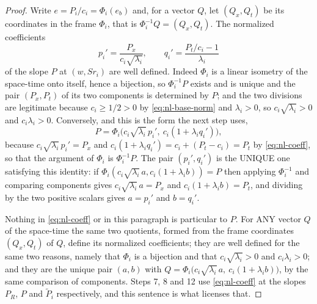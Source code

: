\begin{proof}
Write $e=P_i/c_i=\Phi_i(e_b)$ and, for a vector $Q$, let $(Q_x,Q_t)$ be its
coordinates in the frame $\Phi_i$, that is $\Phi_i^{-1}Q=(Q_x,Q_t)$. The normalized
coefficients
\begin{equation}\label{eq:nl-coeff}
  p_i'=\frac{P_x}{c_i\sqrt{\lambda_i}},\qquad
  q_i'=\frac{P_t/c_i-1}{\lambda_i}
\end{equation}
of the slope $P$ at $(w,Sr_i)$ are well defined. Indeed $\Phi_i$ is a linear isometry
of the space-time onto itself, hence a bijection, so $\Phi_i^{-1}P$ exists and is
unique and the pair $(P_x,P_t)$ of its two components is determined by $P$; and the
two divisions are legitimate because $c_i\ge1/2>0$ by \eqref{eq:nl-base-norm} and
$\lambda_i>0$, so $c_i\sqrt{\lambda_i}>0$ and $c_i\lambda_i>0$. Conversely, and this
is the form the next step uses,
\[
  P=\Phi_i\bigl(c_i\sqrt{\lambda_i}\,p_i',\ c_i(1+\lambda_iq_i')\bigr),
\]
because $c_i\sqrt{\lambda_i}\,p_i'=P_x$ and $c_i(1+\lambda_iq_i')=c_i+(P_t-c_i)=P_t$
by \eqref{eq:nl-coeff}, so that the argument of $\Phi_i$ is $\Phi_i^{-1}P$. The pair
$(p_i',q_i')$ is the UNIQUE one satisfying this identity: if
$\Phi_i(c_i\sqrt{\lambda_i}\,a,c_i(1+\lambda_ib))=P$ then applying $\Phi_i^{-1}$ and
comparing components gives $c_i\sqrt{\lambda_i}\,a=P_x$ and
$c_i(1+\lambda_ib)=P_t$, and dividing by the two positive scalars gives $a=p_i'$ and
$b=q_i'$.

Nothing in \eqref{eq:nl-coeff} or in this paragraph is particular to $P$. For ANY
vector $Q$ of the space-time the same two quotients, formed from the frame
coordinates $(Q_x,Q_t)$ of $Q$, define its normalized coefficients; they are well
defined for the same two reasons, namely that $\Phi_i$ is a bijection and that
$c_i\sqrt{\lambda_i}>0$ and $c_i\lambda_i>0$; and they are the unique pair $(a,b)$
with $Q=\Phi_i\bigl(c_i\sqrt{\lambda_i}\,a,\ c_i(1+\lambda_ib)\bigr)$, by the same
comparison of components. Steps 7, 8 and 12 use \eqref{eq:nl-coeff} at the slopes
$P_R$, $P$ and $\widetilde P_i$ respectively, and this sentence is what licenses
that.


\end{proof}
